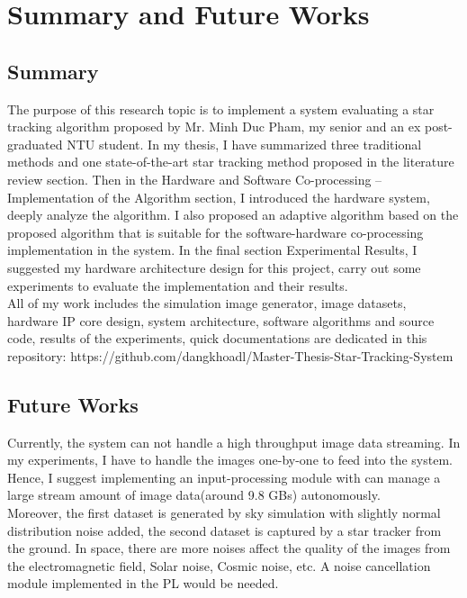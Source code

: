 \chapter{Summary and Future Works}
\label{chap:conclusion}

\section{Summary}

The purpose of this research topic is to implement a system evaluating a star tracking algorithm proposed by Mr. Minh Duc Pham\cite{MDP,edselc.2-52.0-8487677997120120101,edseee.655799920130101}, my senior and an ex post-graduated NTU student. In my thesis, I have summarized three traditional methods and one state-of-the-art star tracking method proposed in the literature review section. Then in the Hardware and Software Co-processing – Implementation of the Algorithm section, I introduced the hardware system, deeply analyze the algorithm. I also proposed an adaptive algorithm based on the proposed algorithm that is suitable for the software-hardware co-processing implementation in the system. In the final section Experimental Results, I suggested my hardware architecture design for this project, carry out some experiments to evaluate the implementation and their results. \\

\noindent All of my work includes the simulation image generator, image datasets, hardware IP core design, system architecture, software algorithms and source code, results of the experiments, quick documentations are dedicated in this repository: https://github.com/dangkhoadl/Master-Thesis-Star-Tracking-System

\section{Future Works}

Currently, the system can not handle a high throughput image data streaming. In my experiments, I have to handle the images one-by-one to feed into the system. Hence, I suggest implementing an input-processing module with can manage a large stream amount of image data(around 9.8 GBs) autonomously. \\

\noindent Moreover, the first dataset is generated by sky simulation with slightly normal distribution noise added, the second dataset is captured by a star tracker from the ground. In space, there are more noises affect the quality of the images from the electromagnetic field, Solar noise, Cosmic noise, etc. A noise cancellation module implemented in the PL would be needed.
